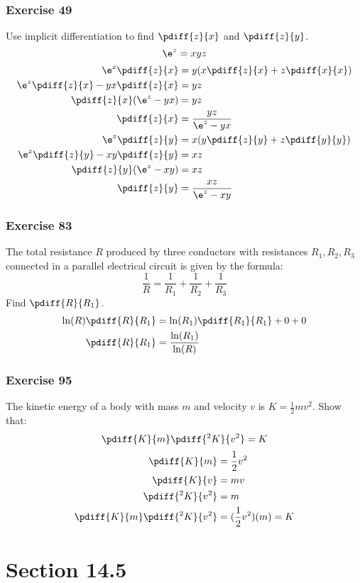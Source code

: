 \documentclass{math}
\begin{document}
\subsubsection*{Exercise 49}
Use implicit differentiation to find \( \pdiff{z}{x} \) and \( \pdiff{z}{y} \).
\[ \e^z = xyz \]
\begin{align*}
  \e^z\pdiff{z}{x} &= y(x\pdiff{z}{x}+z\pdiff{x}{x}) \\
  \e^z\pdiff{z}{x}-yx\pdiff{z}{x} &= yz \\
  \pdiff{z}{x}(\e^z-yx) &= yz \\
  \pdiff{z}{x} &= \frac{yz}{\e^z-yx} \\
  \e^z\pdiff{z}{y} &= x(y\pdiff{z}{y}+z\pdiff{y}{y}) \\
  \e^z\pdiff{z}{y}-xy\pdiff{z}{y} &= xz \\
  \pdiff{z}{y}(\e^z-xy) &= xz \\
  \pdiff{z}{y} &= \frac{xz}{\e^z-xy}
\end{align*}

\subsubsection*{Exercise 83}
The total resistance \( R \) produced by three conductors with resistances
\( R_1,R_2,R_3 \) connected in a parallel electrical circuit is given by
the formula:
\[ \frac{1}{R} = \frac{1}{R_1}+\frac{1}{R_2}+\frac{1}{R_3} \]
Find \( \pdiff{R}{R_1} \).
\begin{align*}
  \ln(R)\pdiff{R}{R_1} &= \ln(R_1)\pdiff{R_1}{R_1}+0+0 \\
  \pdiff{R}{R_1} &= \frac{\ln(R_1)}{\ln(R)}
\end{align*}

\subsubsection*{Exercise 95}
The kinetic energy of a body with mass \( m \) and velocity \( v \) is \( K =
\frac{1}{2}mv^2 \). Show that:
\[ \pdiff{K}{m}\pdiff{^2K}{v^2} = K \]
\begin{align*}
  \pdiff{K}{m} &= \frac{1}{2}v^2 \\
  \pdiff{K}{v} &= mv \\
  \pdiff{^2K}{v^2} &= m \\
  \pdiff{K}{m}\pdiff{^2K}{v^2} &= (\frac{1}{2}v^2)(m) = K
\end{align*}

\section*{Section 14.5}
\end{document}
